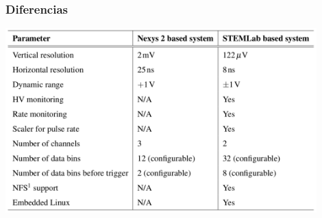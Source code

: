 \documentclass{beamer}
\begin{document}

\begin{frame}
				\frametitle{Diferencias}
				\begin{block}{}
								\centering
								\includegraphics[width=0.9\textwidth]{diferencias_nexys_rp}
				\end{block}
\end{frame}
\end{document}
